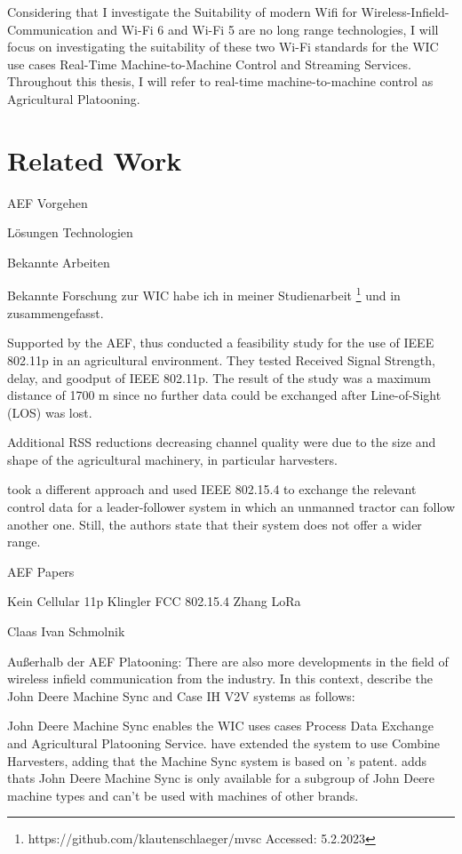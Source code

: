 Considering that I investigate the Suitability of modern Wifi for Wireless-Infield-Communication and Wi-Fi 6 and Wi-Fi 5 are no long range technologies, I will focus on investigating the suitability of these two Wi-Fi standards for the \ac{WIC} use cases Real-Time Machine-to-Machine Control and Streaming Services. Throughout this thesis, I will refer to real-time machine-to-machine control as Agricultural Platooning.
\section{Related Work}
AEF Vorgehen

Lösungen
Technologien

Bekannte Arbeiten 



Bekannte Forschung zur WIC habe ich in meiner Studienarbeit \footnote{https://github.com/klautenschlaeger/mvsc Accessed: 5.2.2023} und in \cite{Beyond} zusammengefasst. 

Supported by the \ac{AEF}, \textcite{klingler} thus
conducted a feasibility study for the use of IEEE 802.11p in an agricultural environment. They tested Received Signal Strength, delay, and goodput of IEEE 802.11p. The result of the study was a maximum distance of 1700 m since no further
data could be exchanged after Line-of-Sight (LOS) was lost.

Additional RSS reductions decreasing channel quality were
due to the size and shape of the agricultural machinery, in
particular harvesters.

\cite{FendtPlatoon} took a different approach
and used IEEE 802.15.4 to exchange the relevant control data
for a leader-follower system in which an unmanned tractor can follow another one. Still, the authors state that their system does not offer a wider range.


AEF Papers

Kein Cellular
11p Klingler
FCC
802.15.4 Zhang
LoRa


Claas Ivan Schmolnik






Außerhalb der AEF Platooning:
There are also more developments in the field of wireless infield communication from the industry. In this context, \textcite{thomasson_review_2018} describe the John Deere Machine Sync and Case IH V2V systems as follows:

John Deere Machine Sync enables the \ac{WIC} uses cases Process Data Exchange and Agricultural Platooning Service. \textcite{liu_automation_2022} have extended the system to use Combine Harvesters, adding that the Machine Sync system is based on \textcite{metzler_system_2006}'s patent. \textcite{IVAN} adds thats John Deere Machine Sync is only available for a subgroup of John Deere machine types and can't be used with machines of other brands. 

